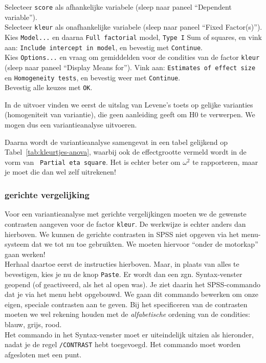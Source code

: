 \documentclass[
]{book}
\begin{document}
Selecteer \texttt{score} als afhankelijke variabele (sleep naar paneel
``Dependent variable'').\\
Selecteer \texttt{kleur} als onafhankelijke variabele (sleep naar paneel ``Fixed
Factor(s)'').\\
Kies \texttt{Model...} en daarna \texttt{Full\ factorial} model, \texttt{Type\ I} Sum
of squares, en vink aan: \texttt{Include\ intercept\ in\ model}, en bevestig met
\texttt{Continue}.\\
Kies \texttt{Options...} en vraag om gemiddelden voor de condities
van de factor \texttt{kleur} (sleep naar paneel ``Display Means for''). Vink aan:
\texttt{Estimates\ of\ effect\ size} en \texttt{Homogeneity\ tests}, en bevestig weer met
\texttt{Continue}.\\
Bevestig alle keuzes met \texttt{OK}.

In de uitvoer vinden we eerst de uitslag van Levene's toets op gelijke
varianties (homogeniteit van variantie), die geen aanleiding geeft om H0
te verwerpen. We mogen dus een variantieanalyse uitvoeren.

Daarna wordt de variantieanalyse samengevat in een tabel gelijkend op
Tabel~\ref{tab:kleurtjes-anova}, waarbij ook de effectgrootte vermeld
wordt in de vorm van \texttt{~Partial\ eta\ square}. Het is echter beter om
\(\omega^2\) te rapporteren, maar je moet die dan wel zelf uitrekenen!

\hypertarget{gerichte-vergelijking}{%
\subsubsection{gerichte vergelijking}\label{gerichte-vergelijking}}

Voor een variantieanalyse met gerichte vergelijkingen moeten we de
gewenste contrasten aangeven voor de factor \texttt{kleur}. De werkwijze is
echter anders dan hierboven. We kunnen de gerichte contrasten in SPSS
niet opgeven via het menu-systeem dat we tot nu toe gebruikten. We
moeten hiervoor ``onder de motorkap'' gaan werken!\\
Herhaal daartoe eerst de instructies hierboven. Maar, in plaats van
alles te bevestigen, kies je nu de knop \texttt{Paste}. Er wordt dan
een zgn. Syntax-venster geopend (of geactiveerd, als het al open was).
Je ziet daarin het SPSS-commando dat je via het menu hebt opgebouwd. We
gaan dit commando bewerken om onze eigen, speciale contrasten aan te
geven. Bij het specificeren van de contrasten moeten we wel rekening
houden met de \emph{alfabetische} ordening van de condities: blauw, grijs,
rood.\\
Het commando in het Syntax-venster moet er uiteindelijk uitzien als
hieronder, nadat je de regel \texttt{/CONTRAST} hebt toegevoegd. Het commando
moet worden afgesloten met een punt.\\
\end{document}
